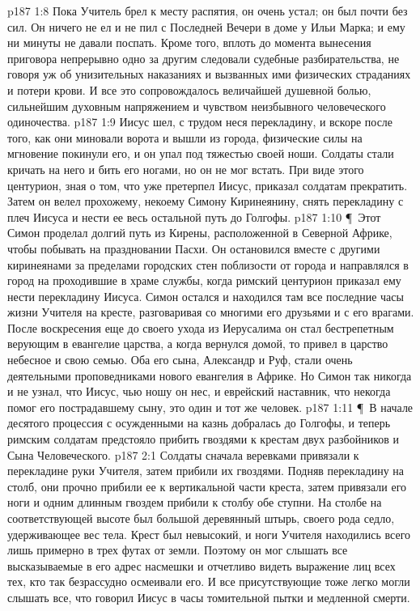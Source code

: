 \vs p187 1:8 Пока Учитель брел к месту распятия, он очень устал; он был почти без сил. Он ничего не ел и не пил с Последней Вечери в доме у Ильи Марка; и ему ни минуты не давали поспать. Кроме того, вплоть до момента вынесения приговора непрерывно одно за другим следовали судебные разбирательства, не говоря уж об унизительных наказаниях и вызванных ими физических страданиях и потери крови. И все это сопровождалось величайшей душевной болью, сильнейшим духовным напряжением и чувством неизбывного человеческого одиночества.
\vs p187 1:9 Иисус шел, с трудом неся перекладину, и вскоре после того, как они миновали ворота и вышли из города, физические силы на мгновение покинули его, и он упал под тяжестью своей ноши. Солдаты стали кричать на него и бить его ногами, но он не мог встать. При виде этого центурион, зная о том, что уже претерпел Иисус, приказал солдатам прекратить. Затем он велел прохожему, некоему Симону Киринеянину, снять перекладину с плеч Иисуса и нести ее весь остальной путь до Голгофы.
\vs p187 1:10 \P\ Этот Симон проделал долгий путь из Кирены, расположенной в Северной Африке, чтобы побывать на праздновании Пасхи. Он остановился вместе с другими киринеянами за пределами городских стен поблизости от города и направлялся в город на проходившие в храме службы, когда римский центурион приказал ему нести перекладину Иисуса. Симон остался и находился там все последние часы жизни Учителя на кресте, разговаривая со многими его друзьями и с его врагами. После воскресения еще до своего ухода из Иерусалима он стал бестрепетным верующим в евангелие царства, а когда вернулся домой, то привел в царство небесное и свою семью. Оба его сына, Александр и Руф, стали очень деятельными проповедниками нового евангелия в Африке. Но Симон так никогда и не узнал, что Иисус, чью ношу он нес, и еврейский наставник, что некогда помог его пострадавшему сыну, это один и тот же человек.
\vs p187 1:11 \P\ В начале десятого процессия с осужденными на казнь добралась до Голгофы, и теперь римским солдатам предстояло прибить гвоздями к крестам двух разбойников и Сына Человеческого.
\vs p187 2:1 Солдаты сначала веревками привязали к перекладине руки Учителя, затем прибили их гвоздями. Подняв перекладину на столб, они прочно прибили ее к вертикальной части креста, затем привязали его ноги и одним длинным гвоздем прибили к столбу обе ступни. На столбе на соответствующей высоте был большой деревянный штырь, своего рода седло, удерживающее вес тела. Крест был невысокий, и ноги Учителя находились всего лишь примерно в трех футах от земли. Поэтому он мог слышать все высказываемые в его адрес насмешки и отчетливо видеть выражение лиц всех тех, кто так безрассудно осмеивали его. И все присутствующие тоже легко могли слышать все, что говорил Иисус в часы томительной пытки и медленной смерти.
